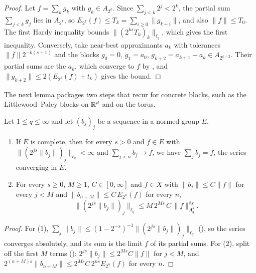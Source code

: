 \begin{proof}
\leanok
{}
Let $f = \sum_k g_k$ with $g_k \in A_{2^k}$. Since $\sum_{j<k} 2^j < 2^k$, the partial sum
$\sum_{j<k} g_j$ lies in $A_{2^k}$, so $E_{2^k}(f) \leq T_k = \sum_{i \geq 0} \|g_{k+i}\|$,
and also $\|f\| \leq T_0$. The first Hardy inequality bounds $\|(2^{ks} T_k)_k\|_{\ell_q}$,
which gives the first inequality. Conversely, take near-best approximants $a_k$ with
tolerances $\|f\| 2^{-k(s+1)}$ and the blocks $g_0 = 0$, $g_1 = a_0$, $g_{k+2} =
a_{k+1} - a_k \in A_{2^{k+2}}$. Their partial sums are the $a_k$, which converge to $f$ by
, and $\|g_{k+2}\| \leq 2(E_{2^k}(f) + t_k)$ gives the bound.
\end{proof}

The next lemma packages two steps that recur for concrete blocks, such as the
Littlewood--Paley blocks on $\mathbb{R}^d$ and on the torus.

\begin{lemma}
\label{lem:weighted-blocks}
\leanok
{}
Let $1 \leq q \leq \infty$ and let $(b_j)_j$ be a sequence in a normed group $E$.
\begin{enumerate}
\item If $E$ is complete, then for every $s > 0$ and $f \in E$ with
  $\|(2^{js} \|b_j\|)_j\|_{\ell_q} < \infty$ and $\sum_{j<n} b_j \to f$, we have
  $\sum_j b_j = f$, the series converging in $E$.
\item For every $s \geq 0$, $M \geq 1$, $C \in [0, \infty]$ and $f \in X$ with
  $\|b_j\| \leq C \|f\|$ for every $j < M$ and $\|b_{n+M}\| \leq C \, E_{2^n}(f)$ for every
  $n$,
  \[
    \|(2^{js} \|b_j\|)_j\|_{\ell_q} \leq M \, 2^{Ms} \, C \, \|f\|^{\mathrm{dy}}_{A^s_q} .
  \]
\end{enumerate}
\end{lemma}

\begin{proof}
\leanok
{}
For (1), $\sum_j \|b_j\| \leq (1 - 2^{-s})^{-1} \|(2^{js} \|b_j\|)_j\|_{\ell_q}$
(), so the series converges absolutely, and its sum is the limit $f$ of its
partial sums. For (2), split off the first $M$ terms ():
$2^{js} \|b_j\| \leq 2^{Ms} C \|f\|$ for $j < M$, and
$2^{(n+M)s} \|b_{n+M}\| \leq 2^{Ms} C \, 2^{ns} E_{2^n}(f)$ for every $n$.
\end{proof}

